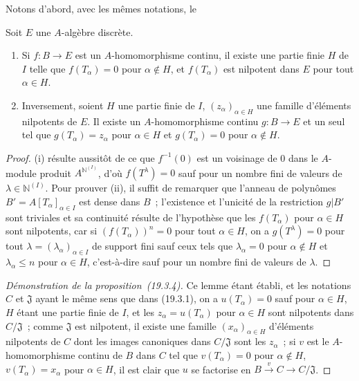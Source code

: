 Notons d'abord, avec les mêmes notations, le
\begin{lemma}[19.3.4.1]
\label{0.19.3.4.1-fr}
Soit $E$ une $A$-algèbre discrète.
\begin{enumerate}
  \item[(i)] Si $f:B\to E$ est un $A$-homomorphisme continu, il existe une
  partie finie $H$ de $I$ telle que $f(T_\alpha)=0$ pour $\alpha\notin H$,
  et $f(T_\alpha)$ est nilpotent dans $E$ pour tout $\alpha\in H$.
  \item[(ii)] Inversement, soient $H$ une partie finie de $I$,
  $(z_\alpha)_{\alpha\in H}$ une famille d'éléments nilpotents de $E$.
  Il existe un $A$-homomorphisme continu $g:B\to E$ et un seul tel que
  $g(T_\alpha)=z_\alpha$ pour $\alpha\in H$ et
  $g(T_\alpha)=0$ pour $\alpha\notin H$.
\end{enumerate}
\end{lemma}


\begin{proof}
(i) résulte aussitôt de ce que $f^{-1}(0)$ est un voisinage de $0$ dans le
$A$-module produit $A^{\mathbb{N}^{(I)}}$, d'où $f(T^\lambda)=0$ sauf pour un
nombre fini de valeurs de $\lambda\in\mathbb{N}^{(I)}$. Pour prouver (ii), il
suffit de remarquer que l'anneau de polynômes
$B'=A[T_\alpha]_{\alpha\in I}$ est dense dans $B$~; l'existence et
l'unicité de la restriction $g|B'$ sont triviales et sa continuité résulte de
l'hypothèse que les $f(T_\alpha)$ pour $\alpha\in H$ sont nilpotents,
car si $(f(T_\alpha))^n=0$ pour tout $\alpha\in H$, on a
$g(T^\lambda)=0$ pour tout $\lambda=(\lambda_\alpha)_{\alpha\in I}$ de
support fini sauf ceux tels que $\lambda_\alpha=0$ pour
$\alpha\notin H$ et $\lambda_\alpha\leq n$ pour
$\alpha\in H$, c'est-à-dire sauf pour un nombre fini de valeurs de
$\lambda$.
\end{proof}

\begin{proof}[Démonstration de la proposition~{\rm(19.3.4)}]
Ce lemme étant établi, et les notations $C$ et $\mathfrak J$ ayant le même
sens que dans (19.3.1), on a $u(T_\alpha)=0$ sauf pour
$\alpha\in H$, $H$ étant une partie finie de $I$, et les
$z_\alpha=u(T_\alpha)$ pour $\alpha\in H$ sont nilpotents dans
$C/\mathfrak J$~; comme $\mathfrak J$ est nilpotent, il existe une famille
$(x_\alpha)_{\alpha\in H}$ d'éléments nilpotents de $C$ dont les images
canoniques dans $C/\mathfrak J$ sont les $z_\alpha$~; si $v$ est le
$A$-homomorphisme continu de $B$ dans $C$ tel que
$v(T_\alpha)=0$ pour $\alpha\notin H$, $v(T_\alpha)=x_\alpha$ pour
$\alpha\in H$, il est clair que $u$ se factorise en
$B\xrightarrow{v}C\to C/\mathfrak J$.
\end{proof}

